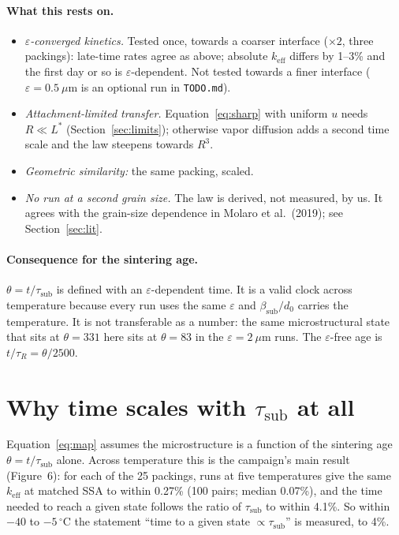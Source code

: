 \documentclass[11pt]{article}
\newcommand{\degC}{\,^{\circ}\mathrm{C}}
\newcommand{\taus}{\tau_{\mathrm{sub}}}
\begin{document}
\paragraph{What this rests on.}
\begin{itemize}
\item \emph{$\varepsilon$-converged kinetics.} Tested once, towards a coarser
  interface ($\times 2$, three packings): late-time rates agree as above;
  absolute $k_{\mathrm{eff}}$ differs by 1--3\% and the first day or so is
  $\varepsilon$-dependent. Not tested towards a finer interface
  ($\varepsilon = 0.5~\mu$m is an optional run in \texttt{TODO.md}).
\item \emph{Attachment-limited transfer.} Equation~\eqref{eq:sharp} with
  uniform $u$ needs $R \ll L^{*}$ (Section~\ref{sec:limits}); otherwise vapor
  diffusion adds a second time scale and the law steepens towards $R^{3}$.
\item \emph{Geometric similarity:} the same packing, scaled.
\item \emph{No run at a second grain size.} The law is derived, not measured,
  by us. It agrees with the grain-size dependence in Molaro et al.\ (2019);
  see Section~\ref{sec:lit}.
\end{itemize}

\paragraph{Consequence for the sintering age.} $\theta = t/\taus$ is defined
with an $\varepsilon$-dependent time. It is a valid clock across temperature
because every run uses the same $\varepsilon$ and $\beta_{\mathrm{sub}}/d_0$
carries the temperature. It is not transferable as a number: the same
microstructural state that sits at $\theta = 331$ here sits at $\theta = 83$
in the $\varepsilon = 2~\mu$m runs. The $\varepsilon$-free age is
$t/\tau_R = \theta/2500$.

\section{Why time scales with $\taus$ at all}

Equation~\eqref{eq:map} assumes the microstructure is a function of the
sintering age $\theta = t/\taus$ alone. Across temperature this is the
campaign's main result (Figure~6): for each of the 25 packings, runs at five
temperatures give the same $k_{\mathrm{eff}}$ at matched SSA to within 0.27\%
(100 pairs; median 0.07\%), and the time needed to reach a given state follows
the ratio of $\taus$ to within 4.1\%. So within $-40$ to $-5\degC$ the
statement ``time to a given state $\propto \taus$'' is measured, to 4\%.
\end{document}
